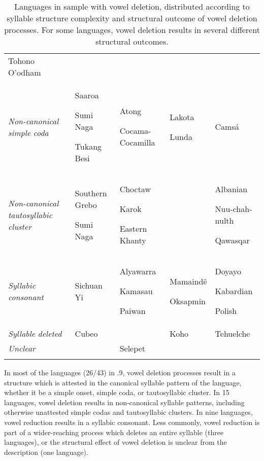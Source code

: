 \begin{table}
\begin{tabularx}{\textwidth}{XXXXX}
Tohono O’odham\\
\textit{Non-canonical} \textit{simple} \textit{coda} & Saaroa

Sumi Naga

Tukang Besi & Atong

Cocama-Cocamilla & Lakota

Lunda & Camsá\\
\textit{Non-canonical} \textit{tautosyllabic} \textit{cluster} & Southern Grebo

Sumi Naga & Choctaw

Karok

Eastern Khanty &  & Albanian

Nuu-chah-nulth

Qawasqar\\
\textit{Syllabic} \textit{consonant} & Sichuan Yi & Alyawarra

Kamasau

Paiwan & Mamaindê

Oksapmin & Doyayo

Kabardian

Polish\\
\textit{Syllable} \textit{deleted} & Cubeo &  & Koho & Tehuelche\\
\textit{Unclear} &  & Selepet &  & \\
\lspbottomrule
\end{tabularx}
\caption{\label{6.9}Languages in sample with vowel deletion, distributed according to syllable structure complexity and structural outcome of vowel deletion processes. For some languages, vowel deletion results in several different structural outcomes.}
\end{table}




  In most of the languages (26/43) in .9, vowel deletion processes result in a structure which is attested in the canonical syllable pattern of the language, whether it be a simple onset, simple coda, or tautosyllabic cluster. In 15 languages, vowel deletion results in non-canonical syllable patterns, including otherwise unattested simple codas and tautosyllabic clusters. In nine languages, vowel reduction results in a syllabic consonant. Less commonly, vowel reduction is part of a wider-reaching process which deletes an entire syllable (three languages), or the structural effect of vowel deletion is unclear from the description (one language).



